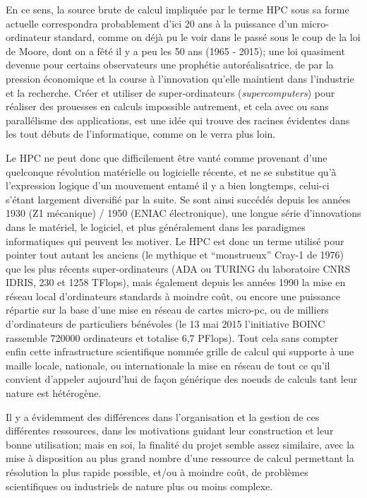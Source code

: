 En ce sens, la source brute de calcul impliquée par le terme HPC sous sa forme actuelle correspondra probablement d'ici 20 ans à la puissance d'un micro-ordinateur standard, comme on déjà pu le voir dans le passé sous le coup de la loi de Moore, dont on a fêté il y a peu les 50 ans (1965 - 2015); une loi quasiment devenue pour certains observateurs une prophétie autoréalisatrice, de par la pression économique et la course à l'innovation qu'elle maintient dans l'industrie et la recherche. Créer et utiliser de super-ordinateurs (\textit{supercomputers}) pour réaliser des prouesses en calculs impossible autrement, et cela avec ou sans parallélisme des applications, est une idée qui trouve des racines évidentes dans les tout débuts de l'informatique, comme on le verra plus loin.

Le HPC ne peut donc que difficilement être vanté comme provenant d'une quelconque révolution matérielle ou logicielle récente, et ne se substitue qu'à l'expression logique d'un mouvement entamé il y a bien longtemps, celui-ci s'étant largement diversifié par la suite. Se sont ainsi succédés depuis les années 1930 (Z1 mécanique) / 1950 (ENIAC électronique), une longue série d'innovations dans le matériel, le logiciel, et plus généralement dans les paradigmes informatiques qui peuvent les motiver. Le HPC est donc un terme utilisé pour pointer tout autant les anciens (le mythique et \enquote{monstrueux} Cray-1 de 1976) que les plus récents super-ordinateurs (ADA ou TURING du laboratoire CNRS IDRIS, 230 et 1258 TFlops), mais également depuis les années 1990 la mise en réseau local d'ordinateurs standards à moindre coût, ou encore une puissance répartie sur la base d'une mise en réseau de cartes micro-pc, ou de milliers d'ordinateurs de particuliers bénévoles (le 13 mai 2015 l'initiative BOINC rassemble 720000 ordinateurs et totalise 6,7 PFlops). Tout cela sans compter enfin cette infrastructure scientifique nommée grille de calcul qui supporte à une maille locale, nationale, ou internationale la mise en réseau de tout ce qu'il convient d'appeler aujourd'hui de façon générique des noeuds de calculs tant leur nature est hétérogène.

Il y a évidemment des différences dans l'organisation et la gestion de ces différentes ressources, dans les motivations guidant leur construction et leur bonne utilisation; mais en soi, la finalité du projet semble assez similaire, avec la mise à disposition au plus grand nombre d'une ressource de calcul permettant la résolution la plus rapide possible, et/ou à moindre coût, de problèmes scientifiques ou industriels de nature plus ou moins complexe.

